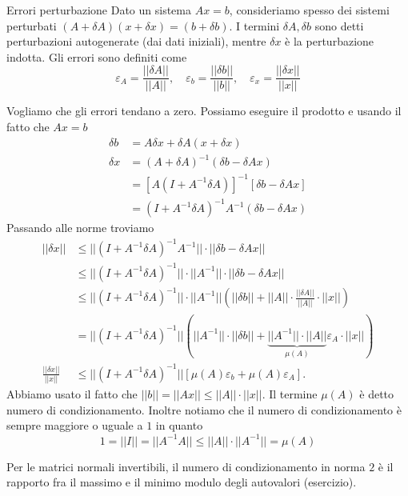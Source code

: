 \documentclass[a4paper]{article}
\begin{document}
\begin{snippetdefinition}{Errori perturbazione}
    Dato un sistema \(Ax=b\),
    consideriamo spesso dei sistemi perturbati
    \((A + \delta A)(x + \delta x) = (b + \delta b)\).
    I termini \(\delta A, \delta b\) sono detti perturbazioni autogenerate (dai dati iniziali),
    mentre \(\delta x\) è la perturbazione indotta.
    Gli errori sono definiti come
    \[
        \varepsilon_A = \frac{||\delta A||}{||A||}, \quad
        \varepsilon_b = \frac{||\delta b||}{||b||}, \quad
        \varepsilon_x = \frac{||\delta x||}{||x||}
    \]
\end{snippetdefinition}
Vogliamo che gli errori
tendano a zero. Possiamo eseguire il prodotto e usando il fatto che \(Ax = b\)
\begin{align*}
    \delta b &= A\delta x + \delta A(x + \delta x) \\
    \delta x &= \left(A + \delta A\right)^{-1}(\delta b - \delta Ax) \\
    &= \left[A(I + A^{-1}\delta A)\right]^{-1}\left[\delta b - \delta Ax\right] \\
    &= (I + A^{-1} \delta A)^{-1} A^{-1}(\delta b - \delta Ax)
\end{align*}
Passando alle norme troviamo
\begin{align*}
    ||\delta x|| &\leq ||(I + A^{-1} \delta A)^{-1} A^{-1}|| \cdot
    ||\delta b - \delta A x|| \\
    &\leq ||(I + A^{-1} \delta A)^{-1} || \cdot ||A^{-1}|| \cdot ||\delta b - \delta Ax|| \\
    &\leq ||(I + A^{-1} \delta A)^{-1} || \cdot ||A^{-1}||
    \left(
        ||\delta b|| + ||A|| \cdot \frac{||\delta A||}{||A||} \cdot ||x||
    \right) \\
    &= ||(I + A^{-1}\delta A)^{-1}|| \left(
        ||A^{-1}|| \cdot ||\delta b|| + \underbrace{||A^{-1}|| \cdot ||A||}_{\mu(A)} \varepsilon_A \cdot ||x||
    \right) \\
    \frac{||\delta x||}{||x||} &\leq ||(I + A^{-1} \delta A)^{-1}||
    \left[
        \mu(A)\varepsilon_b + \mu(A)\varepsilon_A
    \right].
\end{align*}
Abbiamo usato il fatto che \(||b|| = ||Ax|| \leq ||A|| \cdot ||x||\).
Il termine \(\mu(A)\) è detto numero di condizionamento.
Inoltre notiamo che il numero di condizionamento è sempre maggiore o uguale a \(1\)
in quanto
\[
    1 = ||I|| = ||A^{-1} A|| \leq ||A|| \cdot ||A^{-1}|| = \mu(A)
\]

Per le matrici normali invertibili, il numero di condizionamento in norma \(2\) è il rapporto fra il massimo e il minimo modulo degli autovalori (esercizio).
\end{document}
